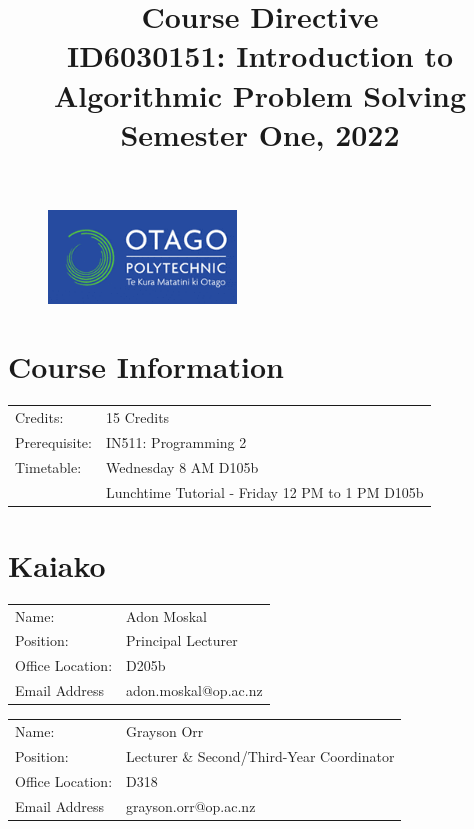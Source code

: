 \documentclass{article}
\author{}
\begin{document}
\begin{figure}
	\includegraphics[width=50mm]{../img/logo.png}
\end{figure}

\title{Course Directive\\ID6030151: Introduction to Algorithmic Problem Solving\\Semester One, 2022}
\date{}
\maketitle

\section*{Course Information}
\begin{tabular}{ll}
	Credits:      & 15 Credits                                                             \\
	Prerequisite: & IN511: Programming 2                                                   \\
	Timetable:    & Wednesday 8 AM D105b                      \\
	              & Lunchtime Tutorial - Friday 12 PM to 1 PM D105b
\end{tabular}

\section*{Kaiako}
\begin{tabular}{ll}
	Name:            & Adon Moskal                             \\
	Position:        & Principal Lecturer \\
	Office Location: & D205b                                    \\
	Email Address    & adon.moskal@op.ac.nz                    \\
\end{tabular}
\begin{tabular}{ll}
	Name:            & Grayson Orr                             \\
	Position:        & Lecturer \& Second/Third-Year Coordinator \\
	Office Location: & D318                                    \\
	Email Address    & grayson.orr@op.ac.nz                    \\
\end{tabular}
\end{document}
